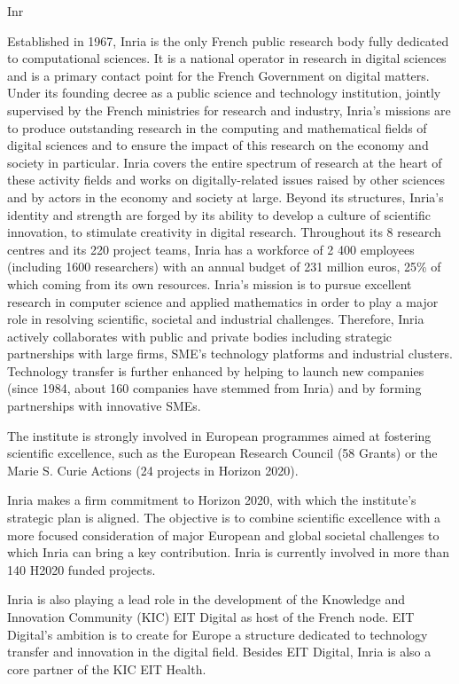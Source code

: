 \begin{sitedescription}{Inr}


Established in 1967, Inria is the only French public research body fully dedicated to computational sciences. It is a national operator in research in digital sciences and is a primary contact point for the French Government on digital matters. Under its founding decree as a public science and technology institution, jointly supervised by the French ministries for research and industry, Inria's missions are to produce outstanding research in the computing and mathematical fields of digital sciences and to ensure the impact of this research on the economy and society in particular. Inria covers the entire spectrum of research at the heart of these activity fields and works on digitally-related issues raised by other sciences and by actors in the economy and society at large. Beyond its structures, Inria's identity and strength are forged by its ability to develop a culture of scientific innovation, to stimulate creativity in digital research. 
Throughout its 8 research centres and its 220 project teams, Inria has a workforce of 2 400 employees (including 1600 researchers) with an annual budget of 231 million euros, 25\% of which coming from its own resources.
Inria’s mission is to pursue excellent research in computer science and applied mathematics in order to play a major role in resolving scientific, societal and industrial challenges. Therefore, Inria actively collaborates with public and private bodies including strategic partnerships with large firms, SME’s technology platforms and industrial clusters. Technology transfer is further enhanced by helping to launch new companies (since 1984, about 160 companies have stemmed from Inria) and by forming partnerships with innovative SMEs.

The institute is strongly involved in European programmes aimed at fostering scientific excellence, such as the European Research Council (58 Grants) or the Marie S. Curie Actions (24 projects in Horizon 2020).

Inria makes a firm commitment to Horizon 2020, with which the institute’s strategic plan is aligned. The objective is to combine scientific excellence with a more focused consideration of major European and global societal challenges to which Inria can bring a key contribution. Inria is currently involved in more than 140 H2020 funded projects.

Inria is also playing a lead role in the development of the Knowledge and Innovation Community (KIC) EIT Digital as host of the French node. EIT Digital’s ambition is to create for Europe a structure dedicated to technology transfer and innovation in the digital field. Besides EIT Digital, Inria is also a core partner of the KIC EIT Health.


\end{sitedescription}
